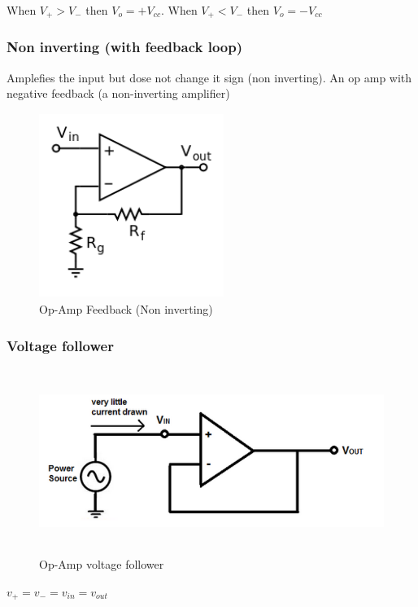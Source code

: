 When $V_+>V_-$ then $V_o=+V_{cc}$. When $V_+<V_-$ then $V_o=-V_{cc}$

\subsubsection{Non inverting (with feedback loop)}
Amplefies the input but dose not change it sign (non inverting).
An op amp with negative feedback (a non-inverting amplifier)

\begin{figure}[h]
    \vspace{10mm}
    \centering
    \includegraphics[width=6cm, height=6cm]{image/Operational_amplifier_noninverting.png}
    \caption{Op-Amp Feedback (Non inverting)}
\end{figure}

\newpage
\subsubsection{Voltage follower}
\begin{figure}[h]
    \vspace{10mm}
    \centering
    \includegraphics[width=12cm, height=6cm]{image/op-amp-voltage-follower.png}
    \caption{Op-Amp voltage follower}
\end{figure}
$v_+=v_-=v_{in}=v_{out}$

\newpage
